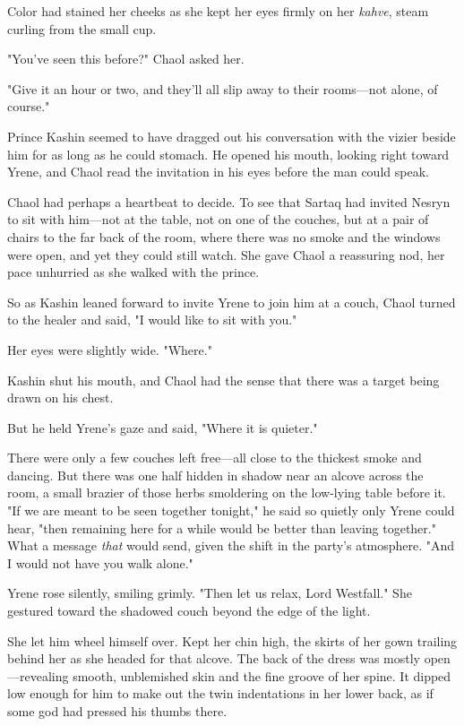Color had stained her cheeks as she kept her eyes firmly on her \emph{kahve}, steam curling from the small cup.

"You've seen this before?"
Chaol asked her.

"Give it an hour or two, and they'll all slip away to their rooms---not alone, of course."

Prince Kashin seemed to have dragged out his conversation with the vizier beside him for as long as he could stomach.
He opened his mouth, looking right toward Yrene, and Chaol read the invitation in his eyes before the man could speak.

Chaol had perhaps a heartbeat to decide.
To see that Sartaq had invited Nesryn to sit with him---not at the table, not on one of the couches, but at a pair of chairs to the far back of the room, where there was no smoke and the windows were open, and yet they could still watch.
She gave Chaol a reassuring nod, her pace unhurried as she walked with the prince.

So as Kashin leaned forward to invite Yrene to join him at a couch, Chaol turned to the healer and said, "I would like to sit with you."

Her eyes were slightly wide.
"Where."

Kashin shut his mouth, and Chaol had the sense that there was a target being drawn on his chest.

But he held Yrene's gaze and said, "Where it is quieter."

There were only a few couches left free---all close to the thickest smoke and dancing.
But there was one half hidden in shadow near an alcove across the room, a small brazier of those herbs smoldering on the low-lying table before it.
"If we are meant to be seen together tonight," he said so quietly only Yrene could hear, "then remaining here for a while would be better than leaving together."
What a message \emph{that} would send, given the shift in the party's atmosphere.
"And I would not have you walk alone."

Yrene rose silently, smiling grimly.
"Then let us relax, Lord Westfall."
She gestured toward the shadowed couch beyond the edge of the light.

She let him wheel himself over.
Kept her chin high, the skirts of her gown trailing behind her as she headed for that alcove.
The back of the dress was mostly open---revealing smooth, unblemished skin and the fine groove of her spine.
It dipped low enough for him to make out the twin indentations in her lower back, as if some god had pressed his thumbs there.

